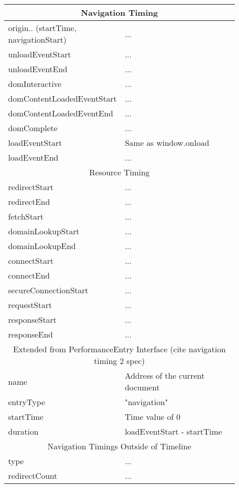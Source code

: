 \begin{center}
	\small
	\begin{longtable}{ | p{0.3\linewidth} | p{0.6\linewidth} | }
	\hline
	\multicolumn{2}{|c|}{ \cellcolor{lightgrey} Navigation Timing} \\
	\hline
	origin.. (startTime, navigationStart) & ... \\
	\hline
	unloadEventStart & ... \\
	\hline
	unloadEventEnd & ... \\
	\hline
	domInteractive & ... \\
	\hline
	domContentLoadedEventStart & ... \\
	\hline
	domContentLoadedEventEnd & ... \\
	\hline
	domComplete & ... \\
	\hline
	loadEventStart & Same as window.onload \\
	\hline
	loadEventEnd & ... \\

	\hline
	\multicolumn{2}{|c|}{ \cellcolor{lightgrey} Resource Timing} \\
	\hline
	redirectStart & ... \\
	\hline
	redirectEnd & ... \\
	\hline
	fetchStart & ... \\
	\hline
	domainLookupStart & ... \\
	\hline
	domainLookupEnd & ... \\
	\hline
	connectStart & ... \\
	\hline
	connectEnd & ... \\
	\hline
	secureConnectionStart & ... \\
	\hline
	requestStart & ... \\
	\hline
	responseStart & ... \\
	\hline
	responseEnd & ... \\

	\hline
	\multicolumn{2}{|c|}{ \cellcolor{lightgrey} Extended from PerformanceEntry Interface (cite navigation timing 2 spec)} \\
	\hline
	name & Address of the current document \\
	\hline
	entryType & "navigation" \\
	\hline
	startTime & Time value of 0 \\
	\hline
	duration & loadEventStart - startTime \\

	\hline
	\multicolumn{2}{|c|}{ \cellcolor{lightgrey} Navigation Timings Outside of Timeline} \\
	\hline
	type & ... \\
	\hline
	redirectCount & ... \\


\end{longtable}
\end{center}
